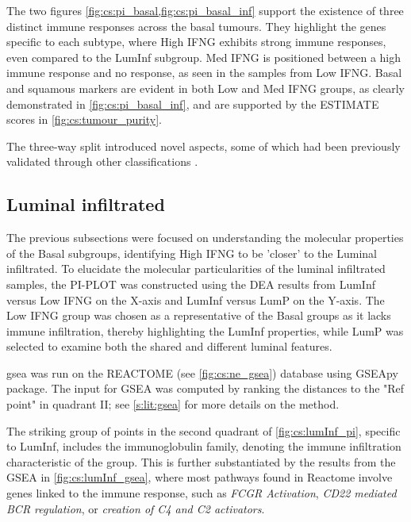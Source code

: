 The two figures \cref{fig:cs:pi_basal,fig:cs:pi_basal_inf} support the existence of three distinct immune responses across the basal tumours. They highlight the genes specific to each subtype, where High IFNG exhibits strong immune responses, even compared to the LumInf subgroup. Med IFNG is positioned between a high immune response and no response, as seen in the samples from Low IFNG. Basal and squamous markers are evident in both Low and Med IFNG groups, as clearly demonstrated in \cref{fig:cs:pi_basal_inf}, and are supported by the ESTIMATE scores in \cref{fig:cs:tumour_purity}.

The three-way split introduced novel aspects, some of which had been previously validated through other classifications \citet{Baker2022-bj,Marzouka2018-ge}. 

\subsection{Luminal infiltrated} \label{s:cs:lumInf_interp}

The previous subsections were focused on understanding the molecular properties of the Basal subgroups, identifying High IFNG to be 'closer' to the Luminal infiltrated. To elucidate the molecular particularities of the luminal infiltrated samples, the \gls{PI-PLOT} was constructed using the DEA results from LumInf versus Low IFNG on the X-axis and LumInf versus LumP on the Y-axis. The Low IFNG group was chosen as a representative of the Basal groups as it lacks immune infiltration, thereby highlighting the LumInf properties, while LumP was selected to examine both the shared and different luminal features.

\acrfull{gsea} was run on the REACTOME (see \cref{fig:cs:ne_gsea}) database using GSEApy \citet{Fang2023-ec} package. The input for GSEA was computed by ranking the distances to the "Ref point" in quadrant II; see \cref{s:lit:gsea} for more details on the method.

The striking group of points in the second quadrant of \cref{fig:cs:lumInf_pi}, specific to LumInf, includes the immunoglobulin family, denoting the immune infiltration characteristic of the group. This is further substantiated by the results from the GSEA in \cref{fig:cs:lumInf_gsea}, where most pathways found in Reactome involve genes linked to the immune response, such as \textit{FCGR Activation}, \textit{CD22 mediated BCR regulation}, or \textit{creation of C4 and C2 activators}.


